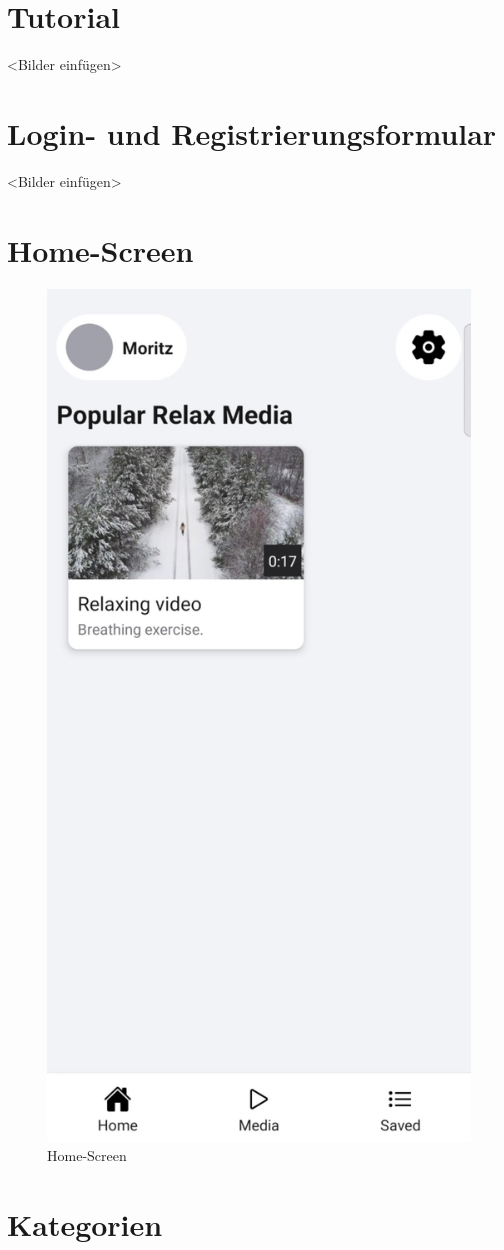 \section{Tutorial}

<Bilder einfügen>

\section{Login- und Registrierungsformular}

<Bilder einfügen>

\section{Home-Screen}

\begin{figure}[H]
    \centering
    \includegraphics[height=\textwidth]{./pics/Home.jpg}
    \caption{Home-Screen}
\end{figure}

\section{Kategorien}

